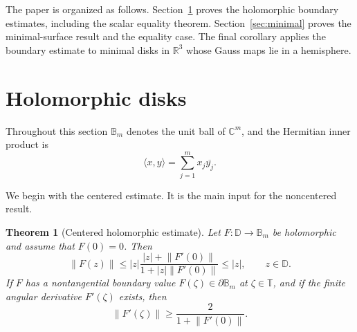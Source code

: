 \documentclass[11pt]{amsart}
\newtheorem{theorem}{Theorem}[section]
\theoremstyle{definition}
\theoremstyle{remark}
\newcommand{\C}{\mathbb C}
\newcommand{\R}{\mathbb R}
\newcommand{\D}{\mathbb D}
\newcommand{\T}{\mathbb T}
\newcommand{\B}{\mathbb B}
\newcommand{\inner}[2]{\langle #1,#2\rangle}
\newcommand{\norm}[1]{\left\|#1\right\|}
\begin{document}
The paper is organized as follows. Section~\ref{sec:holomorphic} proves the holomorphic boundary estimates, including the scalar equality theorem. Section~\ref{sec:minimal} proves the minimal-surface result and the equality case. The final corollary applies the boundary estimate to minimal disks in \(\R^3\) whose Gauss maps lie in a hemisphere.

\section{Holomorphic disks}\label{sec:holomorphic}

Throughout this section \(\B_m\) denotes the unit ball of \(\C^m\), and the Hermitian inner product is
\[
        \inner{x}{y}=\sum_{j=1}^m x_j\overline{y_j}.
\]

We begin with the centered estimate. It is the main input for the noncentered result.

\begin{theorem}[Centered holomorphic estimate]\label{th:centered-holomorphic}
Let \(F:\D\to\B_m\) be holomorphic and assume that \(F(0)=0\). Then
\begin{equation}\label{eq:interior-centered}
        \norm{F(z)}
        \le
        |z|\frac{|z|+\norm{F'(0)}}{1+|z|\norm{F'(0)}}
        \le |z|,
        \qquad z\in\D.
\end{equation}
If \(F\) has a nontangential boundary value \(F(\zeta)\in\partial\B_m\) at \(\zeta\in\T\), and if the finite angular derivative \(F'(\zeta)\) exists, then
\begin{equation}\label{eq:boundary-centered}
        \norm{F'(\zeta)}
        \ge
        \frac{2}{1+\norm{F'(0)}}.
\end{equation}
\end{theorem}
\end{document}
